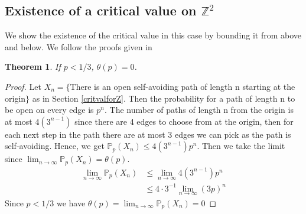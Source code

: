 \documentclass[a4paper,11pt]{article}
\newtheorem{theorem}{Theorem}[section]
\theoremstyle{definition}
\newcommand{\ints}{\mathbb{Z}}
\newcommand{\prob}{\mathbb{P}_p}
\begin{document}
\subsection {Existence of a critical value on $\ints^2$}
We show the existence of the critical value in this case by bounding it from above and below. We follow the proofs given in \cite{steif2011mini}
\begin{theorem}
	If $p < 1/3$, $\theta(p) = 0$.
\end{theorem}
\begin{proof}
	Let $X_n = \{$There is an open self-avoiding path of length n starting at the origin$\}$ as in Section \ref{critvalforZ}.
	Then the probability for a path of length n to be open on every edge is $p^n$. The number of paths of length n from the origin is at most $4(3^{n-1})$ since there are 4 edges to choose from at the origin, then for each next step in the path there are at most 3 edges we can pick as the path is self-avoiding.
	Hence, we get $\prob(X_n) \leq  4(3^{n-1})p^n  $. Then we take the limit since
	$\lim_{n\rightarrow \infty}\prob(X_n) = \theta(p)$.
	\begin{align*}
		\lim_{n\rightarrow \infty}\prob(X_n) &\leq  \lim_{n\rightarrow \infty}4(3^{n-1})p^n\\
		 &\leq 4\cdot  3^{-1} \lim_{n\rightarrow \infty}(3p)^{n}
	 \end{align*}
	 Since $p < 1/3$ we have $\theta(p)=\lim_{n\rightarrow \infty}\prob(X_n) = 0$
\end{proof}
\end{document}

